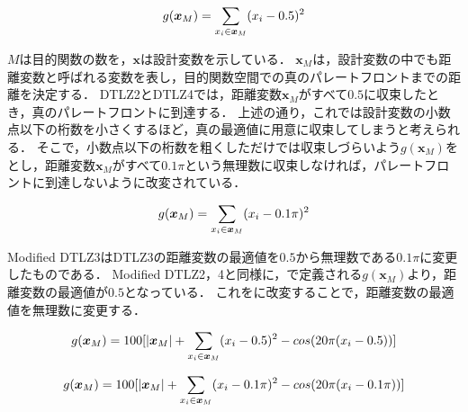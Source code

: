 \documentclass[../main/main]{subfiles}
\begin{document}
\begin{equation}
\centering
g(\bm x_M) = \sum_{x_i \in \bm x_M} (x_i - 0.5)^2
\label{gx_dtlz2}
\end{equation}

$M$は目的関数の数を，$\bm x$は設計変数を示している．
$\bm x_M$は，設計変数の中でも距離変数と呼ばれる変数を表し，目的関数空間での真のパレートフロントまでの距離を決定する．
DTLZ2とDTLZ4では，距離変数$\bm x_M$がすべて$0.5$に収束したとき，真のパレートフロントに到達する．
上述の通り，これでは設計変数の小数点以下の桁数を小さくするほど，真の最適値に用意に収束してしまうと考えられる．
そこで，小数点以下の桁数を粗くしただけでは収束しづらいよう$g(\bm x_M)$をとし，距離変数$\bm x_M$がすべて$0.1\pi$という無理数に収束しなければ，パレートフロントに到達しないように改変されている．

\begin{equation}
\centering
g(\bm x_M) = \sum_{x_i \in \bm x_M} (x_i - 0.1 \pi)^2
\label{gx_mod2}
\end{equation}

Modified DTLZ3はDTLZ3の距離変数の最適値を$0.5$から無理数である$0.1 \pi$に変更したものである．
Modified DTLZ2，4と同様に，で定義される$g(\bm x_M)$より，距離変数の最適値が$0.5$となっている．
これをに改変することで，距離変数の最適値を無理数に変更する．

\begin{equation}
\centering
g(\bm x_M) = 100[|\bm x_M| + \sum_{x_i \in \bm x_M} (x_i - 0.5)^2 - cos(20 \pi (x_i - 0.5 ))]
\label{gx_dtlz3}
\end{equation}

\begin{equation}
\centering
g(\bm x_M) = 100[|\bm x_M| + \sum_{x_i \in \bm x_M} (x_i - 0.1\pi)^2 - cos(20 \pi (x_i - 0.1 \pi ))]
\label{gx_mod3}
\end{equation}

\end{document}

